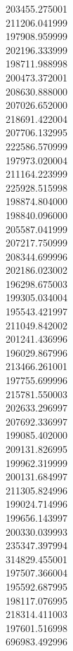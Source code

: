203455.275001\\
211206.041999\\
197908.959999\\
202196.333999\\
198711.988998\\
200473.372001\\
208630.888000\\
207026.652000\\
218691.422004\\
207706.132995\\
222586.570999\\
197973.020004\\
211164.223999\\
225928.515998\\
198874.804000\\
198840.096000\\
205587.041999\\
207217.750999\\
208344.699996\\
202186.023002\\
196298.675003\\
199305.034004\\
195543.421997\\
211049.842002\\
201241.436996\\
196029.867996\\
213466.261001\\
197755.699996\\
215781.550003\\
202633.296997\\
207692.336997\\
199085.402000\\
209131.826995\\
199962.319999\\
200131.684997\\
211305.824996\\
199024.714996\\
199656.143997\\
200330.039993\\
235347.397994\\
314829.455001\\
197507.366004\\
195592.687995\\
198117.076995\\
218314.411003\\
197601.516998\\
696983.492996\\
